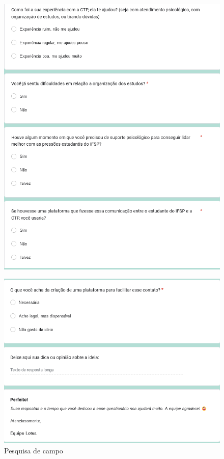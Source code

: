 \documentclass[12pt,a4paper]{article}
\begin{document}
\begin{figure}[H]
    \centering
     \includegraphics[width=15cm]{foto3.png}
\end{figure}

\begin{figure}[H]
    \centering
     \includegraphics[width=15cm]{foto4.png}
     \caption{Pesquisa de campo}
     \label{fig06}
\end{figure}
\end{document}
